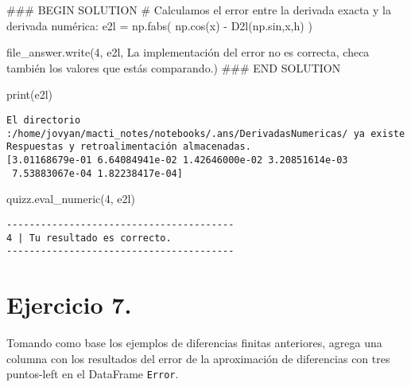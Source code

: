 \documentclass[
  letterpaper,
  DIV=11,
  numbers=noendperiod]{scrreprt}
\newenvironment{Shaded}{\begin{snugshade}}{\end{snugshade}}
\newcommand{\BuiltInTok}[1]{\textcolor[rgb]{0.00,0.23,0.31}{#1}}
\newcommand{\CommentTok}[1]{\textcolor[rgb]{0.37,0.37,0.37}{#1}}
\newcommand{\NormalTok}[1]{\textcolor[rgb]{0.00,0.23,0.31}{#1}}
\newcommand{\OperatorTok}[1]{\textcolor[rgb]{0.37,0.37,0.37}{#1}}
\newcommand{\RegionMarkerTok}[1]{\textcolor[rgb]{0.00,0.23,0.31}{#1}}
\newcommand{\SpecialCharTok}[1]{\textcolor[rgb]{0.37,0.37,0.37}{#1}}
\newcommand{\StringTok}[1]{\textcolor[rgb]{0.13,0.47,0.30}{#1}}
\begin{document}
\begin{Shaded}
\begin{Highlighting}[]
\CommentTok{\#\#\# }\RegionMarkerTok{BEGIN}\CommentTok{ SOLUTION}
\CommentTok{\# Calculamos el error entre la derivada exacta y la derivada numérica:}
\NormalTok{e2l }\OperatorTok{=}\NormalTok{ np.fabs( np.cos(x) }\OperatorTok{{-}}\NormalTok{ D2l(np.sin,x,h) )}

\NormalTok{file\_answer.write(}\StringTok{\textquotesingle{}4\textquotesingle{}}\NormalTok{, e2l, }\StringTok{\textquotesingle{}La implementación del error no es correcta, checa también los valores que estás comparando.\textquotesingle{}}\NormalTok{)}
\CommentTok{\#\#\# }\RegionMarkerTok{END}\CommentTok{ SOLUTION}

\BuiltInTok{print}\NormalTok{(e2l)}
\end{Highlighting}
\end{Shaded}

\begin{verbatim}
El directorio :/home/jovyan/macti_notes/notebooks/.ans/DerivadasNumericas/ ya existe
Respuestas y retroalimentación almacenadas.
[3.01168679e-01 6.64084941e-02 1.42646000e-02 3.20851614e-03
 7.53883067e-04 1.82238417e-04]
\end{verbatim}

\begin{Shaded}
\begin{Highlighting}[]
\NormalTok{quizz.eval\_numeric(}\StringTok{\textquotesingle{}4\textquotesingle{}}\NormalTok{, e2l)}
\end{Highlighting}
\end{Shaded}

\begin{verbatim}
----------------------------------------
4 | Tu resultado es correcto.
----------------------------------------
\end{verbatim}

\section{Ejercicio 7.}\label{ejercicio-7.}

Tomando como base los ejemplos de diferencias finitas anteriores, agrega
una columna con los resultados del error de la aproximación de
diferencias con tres puntos-left en el DataFrame \texttt{Error}.

\begin{Shaded}
\end{Shaded}
\end{document}
